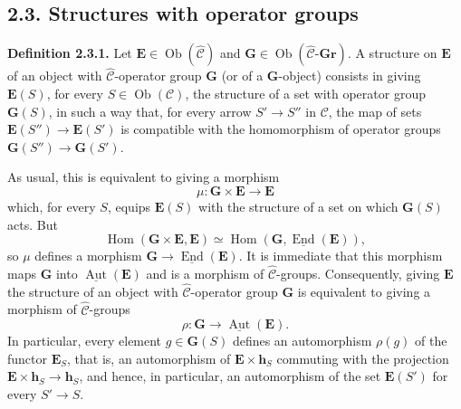 
\subsection*{2.3. Structures with operator groups}

\medskip
\noindent\textbf{Definition 2.3.1.}
Let \(\mathbf E\in\operatorname{Ob}(\widehat{\mathscr C})\) and
\(\mathbf G\in
\operatorname{Ob}(\widehat{\mathscr C}\text{-}\mathbf{Gr})\).
A structure on \(\mathbf E\) of an object with
\(\widehat{\mathscr C}\)-operator group \(\mathbf G\) (or of a
\(\mathbf G\)-object) consists in giving \(\mathbf E(S)\), for every
\(S\in\operatorname{Ob}(\mathscr C)\), the structure of a set with
operator group \(\mathbf G(S)\), in such a way that, for every arrow
\(S'\to S''\) in \(\mathscr C\), the map of sets
\(\mathbf E(S'')\to\mathbf E(S')\) is compatible with the homomorphism
of operator groups \(\mathbf G(S'')\to\mathbf G(S')\).

As usual, this is equivalent to giving a morphism
\[
  \mu:\mathbf G\times\mathbf E\longrightarrow\mathbf E
\]
which, for every \(S\), equips \(\mathbf E(S)\) with the structure of a
set on which \(\mathbf G(S)\) acts. But
\[
  \operatorname{Hom}(\mathbf G\times\mathbf E,\mathbf E)
    \simeq
  \operatorname{Hom}
    (\mathbf G,\underline{\operatorname{End}}(\mathbf E)),
\]
so \(\mu\) defines a morphism
\(\mathbf G\to\underline{\operatorname{End}}(\mathbf E)\). It is
immediate that this morphism maps \(\mathbf G\) into
\(\underline{\operatorname{Aut}}(\mathbf E)\) and is a morphism of
\(\widehat{\mathscr C}\)-groups. Consequently, giving \(\mathbf E\) the
structure of an object with \(\widehat{\mathscr C}\)-operator group
\(\mathbf G\) is equivalent to giving a morphism of
\(\widehat{\mathscr C}\)-groups
\[
  \rho:\mathbf G\longrightarrow
    \underline{\operatorname{Aut}}(\mathbf E).
\]
In particular, every element \(g\in\mathbf G(S)\) defines an
automorphism \(\rho(g)\) of the functor \(\mathbf E_S\), that is, an
automorphism of \(\mathbf E\times\mathbf h_S\) commuting with the
projection \(\mathbf E\times\mathbf h_S\to\mathbf h_S\), and hence, in
particular, an automorphism of the set \(\mathbf E(S')\) for every
\(S'\to S\).

